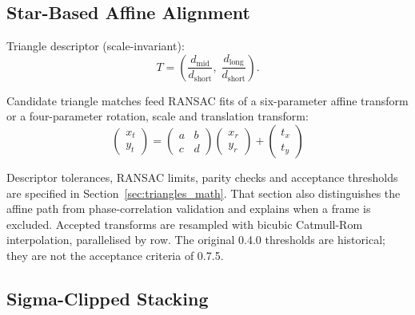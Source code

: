 \documentclass[11pt,a4paper]{article}
\begin{document}
    \subsection{Star-Based Affine Alignment}
    \label{sec:alignment_affine}

    Triangle descriptor (scale-invariant):
    \begin{equation}
        T = \left(\frac{d_{\text{mid}}}{d_{\text{short}}},\; \frac{d_{\text{long}}}{d_{\text{short}}}\right).
    \end{equation}

    Candidate triangle matches feed RANSAC fits of a six-parameter affine transform or a four-parameter rotation, scale and translation transform:
    \begin{equation}
        \begin{pmatrix} x_t \\ y_t \end{pmatrix} =
        \begin{pmatrix} a & b \\ c & d \end{pmatrix}
        \begin{pmatrix} x_r \\ y_r \end{pmatrix} +
        \begin{pmatrix} t_x \\ t_y \end{pmatrix}
    \end{equation}

    Descriptor tolerances, RANSAC limits, parity checks and acceptance thresholds are specified in Section~\ref{sec:triangles_math}. That section also distinguishes the affine path from phase-correlation validation and explains when a frame is excluded. Accepted transforms are resampled with bicubic Catmull-Rom interpolation, parallelised by row. The original 0.4.0 thresholds are historical; they are not the acceptance criteria of 0.7.5.

    \subsection{Sigma-Clipped Stacking}
    \label{sec:sigma_stack}

    \begin{algorithm}[H]
\SetAlgoLined
{}
\caption{Sigma-Clipped Stacking (median+MAD first iter, mean+std subsequent)}
    \end{algorithm}
\end{document}
